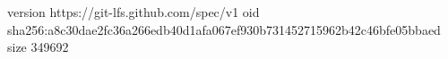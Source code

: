version https://git-lfs.github.com/spec/v1
oid sha256:a8c30dae2fc36a266edb40d1afa067ef930b731452715962b42c46bfe05bbaed
size 349692
